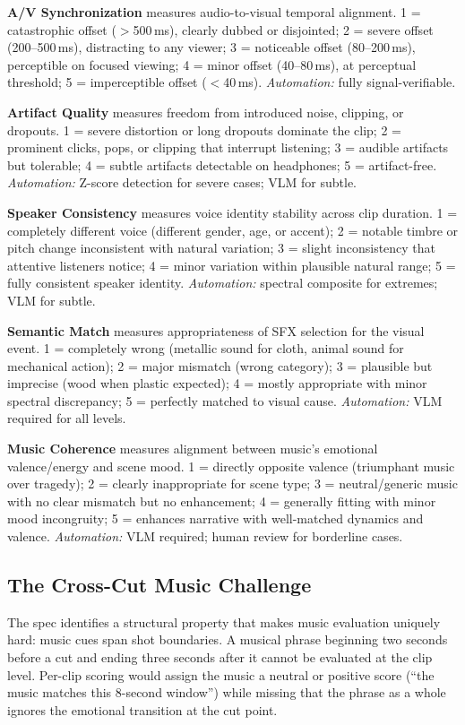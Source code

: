 \documentclass[11pt]{article}
\begin{document}
\textbf{A/V Synchronization} measures audio-to-visual temporal alignment.
1 = catastrophic offset ($>$500\,ms), clearly dubbed or disjointed;
2 = severe offset (200--500\,ms), distracting to any viewer;
3 = noticeable offset (80--200\,ms), perceptible on focused viewing;
4 = minor offset (40--80\,ms), at perceptual threshold;
5 = imperceptible offset ($<$40\,ms). \emph{Automation:} fully signal-verifiable.

\textbf{Artifact Quality} measures freedom from introduced noise, clipping, or dropouts.
1 = severe distortion or long dropouts dominate the clip;
2 = prominent clicks, pops, or clipping that interrupt listening;
3 = audible artifacts but tolerable;
4 = subtle artifacts detectable on headphones;
5 = artifact-free. \emph{Automation:} Z-score detection for severe cases; VLM for subtle.

\textbf{Speaker Consistency} measures voice identity stability across clip duration.
1 = completely different voice (different gender, age, or accent);
2 = notable timbre or pitch change inconsistent with natural variation;
3 = slight inconsistency that attentive listeners notice;
4 = minor variation within plausible natural range;
5 = fully consistent speaker identity. \emph{Automation:} spectral composite for extremes; VLM for subtle.

\textbf{Semantic Match} measures appropriateness of SFX selection for the visual event.
1 = completely wrong (metallic sound for cloth, animal sound for mechanical action);
2 = major mismatch (wrong category);
3 = plausible but imprecise (wood when plastic expected);
4 = mostly appropriate with minor spectral discrepancy;
5 = perfectly matched to visual cause. \emph{Automation:} VLM required for all levels.

\textbf{Music Coherence} measures alignment between music's emotional valence/energy and scene mood.
1 = directly opposite valence (triumphant music over tragedy);
2 = clearly inappropriate for scene type;
3 = neutral/generic music with no clear mismatch but no enhancement;
4 = generally fitting with minor mood incongruity;
5 = enhances narrative with well-matched dynamics and valence. \emph{Automation:} VLM required; human review for borderline cases.

\subsection{The Cross-Cut Music Challenge}

The spec identifies a structural property that makes music evaluation uniquely hard: music
cues span shot boundaries. A musical phrase beginning two seconds before a cut and ending
three seconds after it cannot be evaluated at the clip level. Per-clip scoring would assign
the music a neutral or positive score (``the music matches this 8-second window'') while
missing that the phrase as a whole ignores the emotional transition at the cut point.
\end{document}
